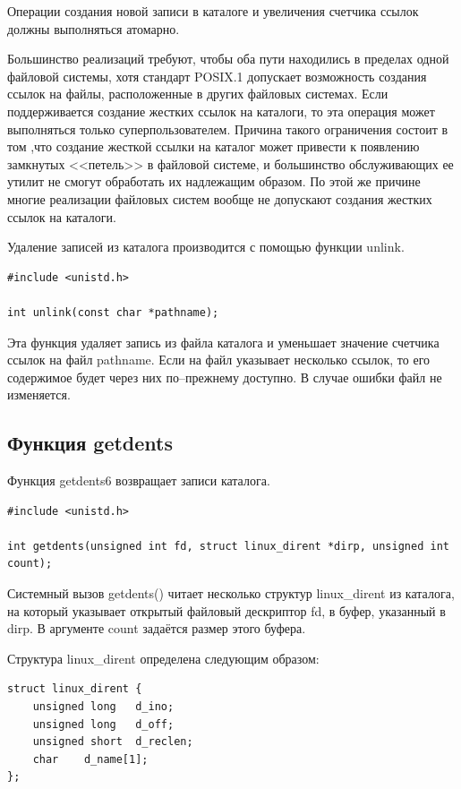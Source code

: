 Операции создания новой записи в каталоге и увеличения счетчика ссылок должны выполняться атомарно. 

Большинство реализаций требуют, чтобы оба пути находились в пределах одной файловой системы, хотя стандарт POSIX.1 допускает возможность создания ссылок на файлы, расположенные в других файловых системах. Если поддерживается создание жестких ссылок на каталоги, то эта операция может выполняться только суперпользователем. Причина такого ограничения состоит в том ,что создание жесткой ссылки на каталог может привести к появлению замкнутых <<петель>> в файловой системе, и большинство обслуживающих ее утилит не смогут обработать их надлежащим образом. По этой же причине многие реализации файловых систем вообще не допускают создания жестких ссылок на каталоги.

Удаление записей из каталога производится с помощью функции unlink.

\begin{lstlisting}[label=code:unlink,caption=Функция unlink]
#include <unistd.h>

int unlink(const char *pathname);
\end{lstlisting}

Эта функция удаляет запись из файла каталога и уменьшает значение счетчика ссылок на файл pathname. Если на файл указывает несколько ссылок, то его содержимое будет через них по--прежнему доступно. В случае ошибки файл не изменяется.


\subsection{Функция getdents}

Функция getdents6 возвращает записи каталога.

\begin{lstlisting}[label=code:getdents64,caption=Функция getdents64]
#include <unistd.h>
	
int getdents(unsigned int fd, struct linux_dirent *dirp, unsigned int count);
\end{lstlisting}

Системный вызов getdents() читает несколько структур linux\_dirent из каталога, на который указывает открытый файловый дескриптор fd, в буфер, указанный в dirp. В аргументе count задаётся размер этого буфера.

Структура linux\_dirent определена следующим образом:
\begin{lstlisting}[label=code:linuxdirent,caption=Структура linux\_dirent]
struct linux_dirent {
	unsigned long	d_ino;
	unsigned long	d_off;
	unsigned short	d_reclen;
	char	d_name[1];
};
\end{lstlisting}

